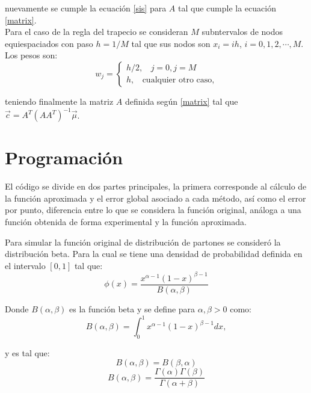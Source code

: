 \documentclass[titlepage,11pt]{report}
\begin{document}
\noindent nuevamente se cumple la ecuación \ref{sis} para $A$ tal que cumple la ecuación \ref{matrix}. \\

Para el caso de la regla del trapecio se consideran $M$ subntervalos de nodos equiespaciados con paso $h=1/M$ tal que sus nodos son $x_i=ih$, $i=0, 1, 2,\cdots, M$. Los pesos son:
\begin{equation*}
    w_j = \left\{ \begin{array}{lcc} h/2,\ \ \ \ j=0, j=M \\
    h, \ \ \ \ \text{cualquier otro caso,} \end{array}\right.
\end{equation*}


\noindent teniendo finalmente la matriz $A$ definida según \ref{matrix} tal que $\vec{c} = A^T(AA^T)^{-1}\vec{\mu}$.

\section{Programación}

El código se divide en dos partes principales, la primera corresponde al cálculo de la función aproximada y el error global asociado a cada método, así como el error por punto, diferencia entre lo que se considera la función original, análoga a una función obtenida de forma experimental y la función aproximada.

Para simular la función original de distribución de partones se consideró la distribución beta. Para la cual se tiene una densidad de probabilidad definida en el intervalo $[0,1]$ tal que:
\begin{equation*}
    \phi(x)=\frac{x^{\alpha-1}(1-x)^{\beta-1}}{B(\alpha, \beta)}
\end{equation*}

Donde $B(\alpha,\beta)$ es la función beta y se define para $\alpha,\beta>0$ como:
\begin{equation*}
    B(\alpha,\beta)=\int_0^{1}x^{\alpha-1}(1-x)^{\beta-1}dx,
\end{equation*}

y es tal que:
\begin{equation*}
    B(\alpha,\beta)=B(\beta, \alpha)
\end{equation*}
\begin{equation*}
    B(\alpha,\beta)=\frac{\Gamma(\alpha)\Gamma(\beta)}{\Gamma(\alpha+\beta)}
\end{equation*}
\end{document}
